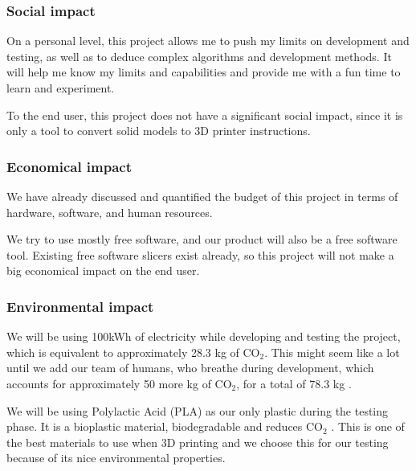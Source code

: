 \subsubsection{Social impact}
On a personal level, this project allows me to push my limits on development and testing, as well as to deduce complex algorithms and development methods. It will help me know my limits and capabilities and provide me with a fun time to learn and experiment.

To the end user, this project does not have a significant social impact, since it is only a tool to convert solid models to 3D printer instructions.


\subsubsection{Economical impact}
We have already discussed and quantified the budget of this project in terms of hardware, software, and human resources. 

We try to use mostly free software, and our product will also be a free software tool. Existing free software slicers exist already, so this project will not make a big economical impact on the end user.


\subsubsection{Environmental impact}
We will be using 100kWh of electricity while developing and testing the project, which is equivalent to approximately 28.3 kg of CO${_2}$. This might seem like a lot until we add our team of humans, who breathe during development, which accounts for approximately 50 more kg of CO${_2}$, for a total of 78.3 kg \cite{co2-breathing}.


We will be using Polylactic Acid (PLA) as our only plastic during the testing phase. It is a bioplastic material, biodegradable and reduces CO$_{2}$ \cite{pla-co2, env-impact-3dp}. This is one of the best materials to use when 3D printing and we choose this for our testing because of its nice environmental properties.






